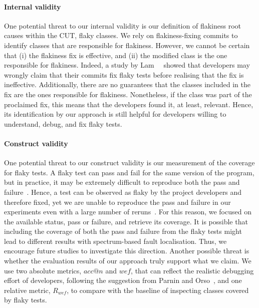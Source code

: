 \paragraph{Internal validity}
One potential threat to our internal validity is our definition of flakiness root causes within the CUT, \ie flaky classes.
We rely on flakiness-fixing commits to identify classes that are responsible for flakiness.
However, we cannot be certain that (i) the flakiness fix is effective, and (ii) the modified class is the one responsible for flakiness.
Indeed, a study by Lam~\etal~\cite{Lam2020a} showed that developers may wrongly claim that their commits fix flaky tests before realising that the fix is ineffective.
Additionally, there are no guarantees that the classes included in the fix are the ones responsible for flakiness.
Nonetheless, if the class was part of the proclaimed fix, this means that the developers found it, at least, relevant. Hence, its identification by our approach is still helpful for developers willing to understand, debug, and fix flaky tests.

\paragraph{Construct validity} 
One potential threat to our construct validity is our measurement of the coverage for flaky tests.
A flaky test can pass and fail for the same version of the program, but in practice, it may be extremely difficult to reproduce both the pass and failure~\cite{alshammari2021flakeflagger,Lam2020}.
Hence, a test can be observed as flaky by the project developers and therefore fixed, yet we are unable to reproduce the pass and failure in our experiments even with a large number of reruns~\cite{alshammari2021flakeflagger}.
For this reason, we focused on the available status, \ie pass or failure, and retrieve its coverage.
It is possible that including the coverage of both the pass and failure from the flaky tests might lead to different results with spectrum-based fault localisation.
Thus, we encourage future studies to investigate this direction.
Another possible threat is whether the evaluation results of our approach truly support what we claim. %
We use two absolute metrics, $acc@n$ and $wef$, that can reflect the realistic debugging effort of developers, following the suggestion from Parnin and Orso~\cite{parnin}, and one relative metric, $R_{wef}$, to compare with the baseline of inspecting classes covered by flaky tests. 
